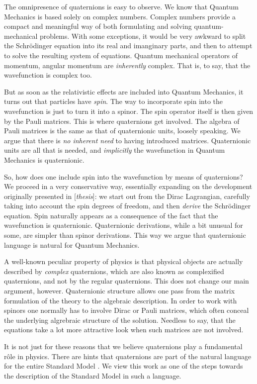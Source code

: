 \documentclass[epsfig,12pt]{article}
\begin{document}
	The omnipresence of quaternions is easy to observe.
	We know that Quantum Mechanics is based solely on complex numbers.
	Complex numbers provide a compact and meaningful way of both formulating and solving quantum-mechanical problems.
	With some exceptions, it would be very awkward to split the Schr\"odinger equation into its real and imanginary parts,
	and then to attempt to solve the resulting system of equations.
	Quantum mechanical operators of momentum, angular momentum are \emph{inherently} complex.
	That is, to say, that the wavefunction is complex too.
	
	But as soon as the relativistic effects are included into Quantum Mechanics, it turns out that particles
	have \emph{spin}.
	The way to incorporate spin into the wavefunction is just to turn it into a spinor.
	The spin operator itself is then given by the Pauli matrices.
	This is where quaternions get involved.
	The algebra of Pauli matrices is the same as that of quaternionic units, loosely speaking.
	We argue that there is \emph{no inherent need} to having introduced matrices.
	Quaternionic units are all that is needed, and \emph{implicitly} the wavefunction in Quantum Mechanics is quaternionic.

	So, how does one include spin into the wavefunction by means of quaternions?
	We proceed in a very conservative way, essentially expanding on the development originally presented in [{\it thesis}]:
	we start out from the Dirac Lagrangian, carefully taking into account the spin degrees of freedom,
	and then \emph{derive} the Schr\"odinger equation.
	Spin naturally appears as a consequence of the fact that the wavefunction is quaternionic.
	Quaternionic derivations, while a bit unusual for some, are simpler than spinor derivations.
	This way we argue that quaternionic language is natural for Quantum Mechanics.

	A well-known peculiar property of physics is that physical objects are actually described by \emph{complex} quaternions,
	which are also known as complexified quaternions, and not by the regular quaternions.
	This does not change our main argument, however.
	Quaternionic structure allows one pass from the matrix formulation of the theory to the algebraic description.
	In order to work with spinors one normally has to involve Dirac or Pauli matrices, which often conceal
	the underlying algrebraic structure of the solution.
	Needless to say, that the equations take a lot more attractive look when such matrices are not involved.

	It is not just for these reasons that we believe quaternions play a fundamental r\^ole in physics.
	There are hints that quaternions are part of the natural language for the entire Standard Model \cite{}.
	We view this work as one of the steps towards the description of the Standard Model in
	such a language.
\end{document}

